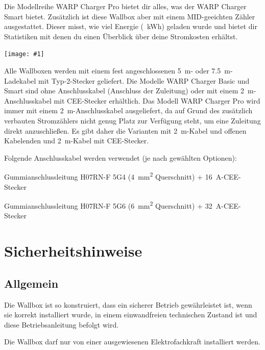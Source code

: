 \documentclass[a4paper,10pt]{article}
\newcommand{\hint}[1]{\begin{tcolorbox}[colback=boxgray,colframe=black,coltext=
white,title=Hinweis]#1\end{tcolorbox}}
\newcommand{\gfx}[1]{\texttt{[image: \#1]}}
\begin{document}
\begin{multicols*}{2}
	Die Modellreihe WARP Charger Pro bietet dir alles, was der WARP Charger Smart
	bietet. Zusätzlich ist diese Wallbox aber mit einem MID-geeichten Zähler
	ausgestattet. Dieser misst, wie viel Energie (\SI{}{\kWh}) geladen
	wurde und bietet dir Statistiken mit denen du einen Überblick über deine
	Stromkosten erhältst.

	\gfx{./img/resized/type_2_connector_ready}

	Alle Wallboxen werden mit einem fest angeschlossenen
	\SI{5}{\meter}- oder \SI{7,5}{\meter}-Ladekabel mit Typ-2-Stecker geliefert. Die Modelle WARP
	Charger Basic und Smart sind ohne Anschlusskabel (Anschluss der Zuleitung)
	oder mit einem \SI{2}{\meter}-Anschlusskabel mit CEE-Stecker
	erhältlich. Das Modell WARP Charger Pro wird immer mit einem
	\SI{2}{\meter}-Anschlusskabel ausgeliefert, da auf Grund des zusätzlich
	verbauten Stromzählers nicht genug Platz zur Verfügung steht, um eine Zuleitung
	direkt anzuschließen. Es gibt daher die Varianten mit
	\SI{2}{\meter}-Kabel und offenen Kabelenden und
	\SI{2}{\meter}-Kabel mit CEE-Stecker.

	Folgende Anschlusskabel werden verwendet (je nach gewählten Optionen):

	\begin{description}[leftmargin=!,labelwidth=\widthof{\textbf{\SI{22}{\kilo\watt}}}]
		\item[\SI{11}{\kilo\watt}]Gummianschlussleitung H07RN-F 5G4
		      (\SI{4}{\square\milli\meter}
		      Querschnitt) + \SI{16}{\ampere}-CEE-Stecker
		\item[\SI{22}{\kilo\watt}]Gummianschlussleitung H07RN-F 5G6
		      (\SI{6}{\square\milli\meter}
		      Querschnitt) + \SI{32}{\ampere}-CEE-Stecker
	\end{description}

	\section{Sicherheitshinweise}
	\subsection{Allgemein}
	Die Wallbox ist so konstruiert, dass ein sicherer Betrieb gewährleistet ist,
	wenn sie korrekt installiert wurde, in einem einwandfreien technischen Zustand
	ist und diese Betriebsanleitung befolgt wird. \hint{Die Wallbox darf nur von einer ausgewiesenen Elektrofachkraft installiert
		werden.}


\end{multicols*}
\end{document}
